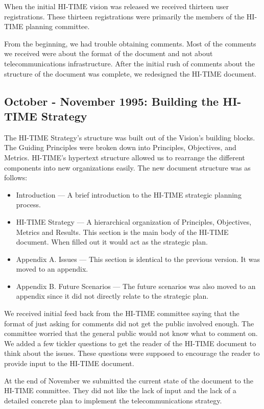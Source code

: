 When the initial HI-TIME vision was released we received thirteen user
registrations.  These thirteen registrations were primarily the members of
the HI-TIME planning committee.  

From the beginning, we had trouble obtaining comments.  Most of the
comments we received were about the format of the document and not about
telecommunications infrastructure.  After the initial rush of comments
about the structure of the document was complete, we redesigned the HI-TIME
document.

\subsection{October - November 1995: Building the HI-TIME Strategy}

The HI-TIME Strategy's structure was built out of the Vision's building
blocks.  The Guiding Principles were broken down into Principles,
Objectives, and Metrics.  HI-TIME's hypertext structure allowed us to
rearrange the different components into new organizations easily.  The new
document structure was as follows:
\begin{itemize}
\item Introduction --- A brief introduction to the HI-TIME strategic
  planning process.
\item HI-TIME Strategy --- A hierarchical organization of Principles,
  Objectives, Metrics and Results.  This section is the main body of the
  HI-TIME document.  When filled out it would act as the strategic plan.
\item Appendix A. Issues --- This section is identical to the previous
  version.  It was moved to an appendix.
\item Appendix B. Future Scenarios --- The future scenarios was also
  moved to an appendix since it did not directly relate to the strategic
  plan.
\end{itemize}
We received initial feed back from the HI-TIME committee saying that the
format of just asking for comments did not get the public involved enough.
The committee worried that the general public would not know what to
comment on.  We added a few tickler questions to get the reader of the
HI-TIME document to think about the issues.  These questions were supposed
to encourage the reader to provide input to the HI-TIME document. 

At the end of November we submitted the current state of the document to
the HI-TIME committee.  They did not like the lack of input and the lack of
a detailed concrete plan to implement the telecommunications strategy.

